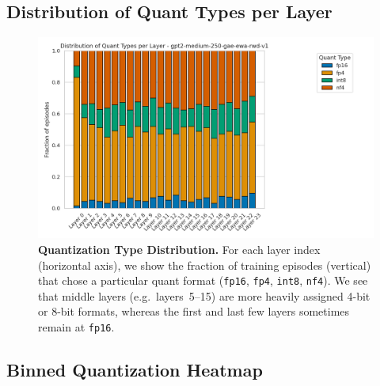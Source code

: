 \documentclass{article}
\begin{document}
	\subsection{Distribution of Quant Types per Layer}
	\label{sec:medium-quant-dist}
	
	\begin{figure}[ht]
		\centering
		\includegraphics[width=0.85\linewidth]{gpt2-medium-250-gae-ewa-rwd-v1_quant_dist_bar.png}
		\caption{\small
			\textbf{Quantization Type Distribution.}
			For each layer index (horizontal axis), we show the fraction of training episodes (vertical) that chose a particular quant format (\texttt{fp16}, \texttt{fp4}, \texttt{int8}, \texttt{nf4}). 
			We see that middle layers (e.g.\ layers~5--15) are more heavily assigned 4-bit or 8-bit formats, whereas the first and last few layers sometimes remain at \texttt{fp16}.
		}
		\label{fig:gpt2medium-quant-dist}
	\end{figure}
	
	\subsection{Binned Quantization Heatmap}
	\label{sec:medium-heatmap}
	
\end{document}
